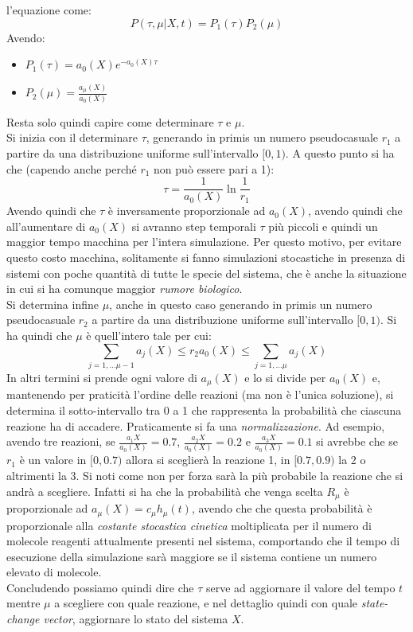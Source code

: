 \documentclass[a4paper,12pt, oneside]{book}
\begin{document}
l'equazione come:
\[P(\tau,\mu|X,t)=P_1(\tau)P_2(\mu)\]
Avendo:
\begin{itemize}
  \item $P_1(\tau)=a_0 (X)e^{-a_0(X)\tau}$
  \item $P_2(\mu)=\frac{a_\mu(X)}{a_0(X)}$
\end{itemize}
Resta solo quindi capire come determinare $\tau$ e $\mu$.\\
Si inizia con il determinare $\tau$, generando in primis un numero pseudocasuale
$r_1$ a partire da una distribuzione uniforme sull'intervallo $[0,1)$. A questo
punto si ha che (capendo anche perché $r_1$ non può essere pari a 1):
\[\tau=\frac{1}{a_0(X)}\ln\frac{1}{r_1}\]
Avendo quindi che $\tau$ è inversamente proporzionale ad $a_0(X)$, avendo quindi
che all'aumentare di $a_0(X)$ si avranno step temporali $\tau$ più piccoli e
quindi un maggior tempo macchina per l'intera simulazione. Per questo motivo,
per evitare questo costo macchina, solitamente si fanno simulazioni stocastiche
in presenza di sistemi con poche quantità di tutte le specie del sistema, che è
anche la situazione in cui si ha comunque maggior \textit{rumore biologico}.\\
Si determina infine $\mu$, anche in questo caso generando in primis un numero
pseudocasuale $r_2$ a partire da una distribuzione uniforme sull'intervallo
$[0,1)$. Si ha quindi che $\mu$ è quell'intero tale per cui:
\[\sum_{j=1,\ldots\mu-1}a_j(X)\leq r_2a_0(X)\leq\sum_{j=1,\ldots\mu}a_j(X)\]
In altri termini si prende ogni valore di $a_\mu(X)$ e lo si divide per
$a_0(X)$ e, mantenendo per praticità l'ordine delle reazioni (ma non è l'unica
soluzione), si determina il sotto-intervallo tra 0 a 1 che rappresenta la
probabilità che ciascuna reazione ha di accadere. Praticamente si fa una
\textit{normalizzazione}. Ad esempio, avendo tre reazioni, se 
$\frac{a_1{X}}{a_0(X)}=0.7$, $\frac{a_2{X}}{a_0(X)}=0.2$ e
$\frac{a_3{X}}{a_0(X)}=0.1$ si avrebbe che se $r_1$ è un valore in $[0, 0.7)$
allora si sceglierà la reazione 1, in $[0.7,0.9)$ la 2 o altrimenti la
3. Si noti come non per forza sarà la più probabile la reazione che si andrà a
scegliere. Infatti si ha che la probabilità che venga scelta $R_\mu$ è
proporzionale ad $a_\mu(X)=c_\mu h_\mu(t)$, avendo che che questa probabilità è
proporzionale alla \textit{costante stocastica cinetica} moltiplicata per il
numero di molecole reagenti attualmente presenti nel sistema, comportando che il
tempo di esecuzione della simulazione sarà maggiore se il sistema contiene un
numero elevato di molecole.\\
Concludendo possiamo quindi dire che $\tau$ serve ad aggiornare il valore del
tempo $t$ mentre $\mu$ a scegliere con quale reazione, e nel dettaglio quindi
con quale \textit{state-change vector}, aggiornare lo stato del sistema $X$. 
\end{document}
